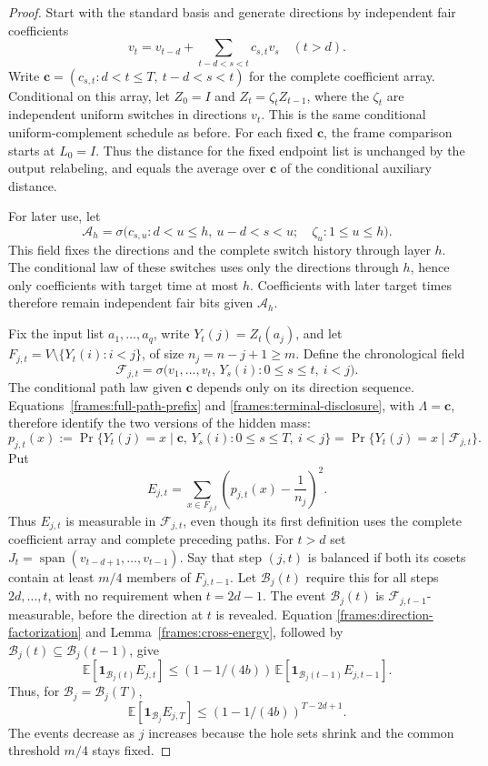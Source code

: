 \begin{proof}
Start with the standard basis and generate directions by independent
fair coefficients
\[
 v_t=v_{t-d}+\sum_{t-d<s<t}c_{s,t}v_s\quad(t>d).
\]
Write $\mathbf c=(c_{s,t}:d<t\le T,\ t-d<s<t)$ for the complete
coefficient array. Conditional on this array, let
$Z_0=I$ and $Z_t=\zeta_tZ_{t-1}$, where the $\zeta_t$ are independent
uniform switches in directions $v_t$. This is the same conditional
uniform-complement schedule as before. For each fixed $\mathbf c$,
the frame comparison starts at $L_0=I$. Thus the distance for the
fixed endpoint list is unchanged by the output relabeling, and equals
the average over $\mathbf c$ of the conditional auxiliary distance.

For later use, let
\begin{equation}
 \mathcal A_h=\sigma\bigl(
       c_{s,u}:d<u\le h,\ u-d<s<u;\quad
       \zeta_u:1\le u\le h\bigr). \label{frames:stopped-generated-field}
\end{equation}
This field fixes the directions and the complete switch history through
layer $h$. The conditional law of these switches uses only the directions
through $h$, hence only coefficients with target time at most $h$.
Coefficients with later target times therefore remain independent fair
bits given $\mathcal A_h$.

Fix the input list $a_1,\ldots,a_q$, write $Y_t(j)=Z_t(a_j)$, and let
$F_{j,t}=V\setminus\{Y_t(i):i<j\}$, of size $n_j=n-j+1\ge m$.
Define the chronological field
\[
 \mathcal F_{j,t}
 =\sigma\bigl(v_1,\ldots,v_t,\,
       Y_s(i):0\le s\le t,\ i<j\bigr).
\]
The conditional path law given $\mathbf c$ depends only on its
direction sequence. Equations~\eqref{frames:full-path-prefix} and
\eqref{frames:terminal-disclosure}, with $\Lambda=\mathbf c$, therefore
identify the two versions of the hidden mass:
\[
 p_{j,t}(x)
 :=\Pr\{Y_t(j)=x\mid\mathbf c,\,
               Y_s(i):0\le s\le T,\ i<j\}
 =\Pr\{Y_t(j)=x\mid\mathcal F_{j,t}\}.
\]
Put
\[
 E_{j,t}=\sum_{x\in F_{j,t}}
             \left(p_{j,t}(x)-\frac1{n_j}\right)^2.
\]
Thus $E_{j,t}$ is measurable in $\mathcal F_{j,t}$, even though its
first definition uses the complete coefficient array and complete
preceding paths. For $t>d$ set
$J_t=\operatorname{span}(v_{t-d+1},\ldots,v_{t-1})$.
Say that step $(j,t)$ is balanced if both its cosets contain at least
$m/4$ members of $F_{j,t-1}$. Let $\mathcal B_j(t)$ require this for
all steps $2d,\ldots,t$, with no requirement when $t=2d-1$.
The event $\mathcal B_j(t)$ is $\mathcal F_{j,t-1}$-measurable, before
the direction at $t$ is revealed. Equation
\eqref{frames:direction-factorization} and
Lemma~\ref{frames:cross-energy}, followed by
$\mathcal B_j(t)\subseteq\mathcal B_j(t-1)$, give
\[
 \mathbb E[\mathbf1_{\mathcal B_j(t)}E_{j,t}]
 \le(1-1/(4b))\,
        \mathbb E[\mathbf1_{\mathcal B_j(t-1)}E_{j,t-1}].
\]
Thus, for $\mathcal B_j=\mathcal B_j(T)$,
\begin{equation}
 \mathbb E[\mathbf1_{\mathcal B_j}E_{j,T}]
 \le(1-1/(4b))^{T-2d+1}.
 \label{frames:stopped-energy}
\end{equation}
The events decrease as $j$ increases because the hole sets shrink and
the common threshold $m/4$ stays fixed.


\end{proof}
